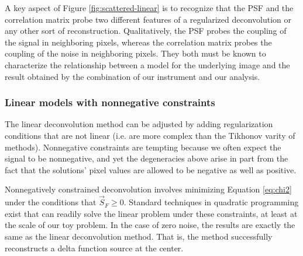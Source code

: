 \documentclass[twocolumn,tighten]{aastex61}
\begin{document}
A key aspect of Figure \ref{fig:scattered-linear} is to recognize that
the PSF and the correlation matrix probe two different features of a
regularized deconvolution or any other sort of
reconstruction. Qualitatively, the PSF probes the coupling of the
signal in neighboring pixels, whereas the correlation matrix probes
the coupling of the noise in neighboring pixels. They both must be
known to characterize the relationship between a model for the
underlying image and the result obtained by the combination of our
instrument and our analysis.

\subsubsection{Linear models with nonnegative constraints}
\label{sec:nnls}

The linear deconvolution method can be adjusted by adding
regularization conditions that are not linear (i.e. are more complex
than the Tikhonov varity of methods). Nonnegative constraints are
tempting because we often expect the signal to be nonnegative, and yet
the degeneracies above arise in part from the fact that the solutions'
pixel values are allowed to be negative as well as positive.

Nonnegatively constrained deconvolution involves minimizing Equation
\ref{eq:chi2} under the conditions that $\vec{S}_F \ge 0$. Standard
techniques in quadratic programming exist that can readily solve the
linear problem under these constraints, at least at the scale of our
toy problem.  In the case of zero noise, the results are exactly the
same as the linear deconvolution method. That is, the method
successfully reconstructs a delta function source at the center.
\end{document}
